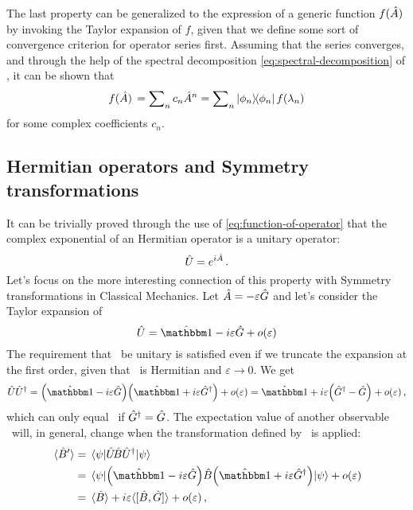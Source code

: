             The last property can be generalized to the expression of a generic function $f\pqty*{\hA}$ by invoking the Taylor expansion of $f$, given that we define some sort of convergence criterion for operator series first. Assuming that the series converges, and through the help of the spectral decomposition \eqref{eq:spectral-decomposition} of \hA, it can be shown that
            \begin{equation}
                \label{eq:function-of-operator}
                f\pqty*{\hA} = \sum\nolimits_n c_n \hA^n = \sum\nolimits_n \dyad{\phi_n}{\phi_n} f\pqty{\lambda_n}
            \end{equation}
            for some complex coefficients $c_n$.
        \subsection{Hermitian operators and Symmetry transformations}\label{ss:unitary-transformations}
            It can be trivially proved \cite{Bernardini1993-iy} through the use of \eqref{eq:function-of-operator} that the complex exponential of an Hermitian operator is a unitary operator:
            \begin{equation*}
                \hat{U} = e^{i\hat{A}}
                \,\text{.}
            \end{equation*}
            Let's focus on the more interesting connection of this property with Symmetry transformations in Classical Mechanics. Let $\hat{A} = -\varepsilon\hat{G}$ and let's consider the Taylor expansion of \hU
            \begin{equation*}
                \hU = \hidM - i\varepsilon\hG + o\pqty{\varepsilon}
            \end{equation*}
            The requirement that \hU\ be unitary is satisfied even if we truncate the expansion at the first order, given that \hG\ is Hermitian and $\varepsilon \to 0$. We get
            \begin{equation*}
                \hU\hU^\dag = \pqty{\hidM - i\varepsilon\hG}\pqty{\hidM + i\varepsilon\hG^\dag} + o\pqty{\varepsilon} = \hidM + i\varepsilon\pqty{\hG^\dag - \hG} + o\pqty{\varepsilon}
                \mycomma
            \end{equation*}
            which can only equal \hidM\ if $\hat{G}^\dag = \hat{G}$. The expectation value of another observable \hB\ will, in general, change when the transformation defined by \hU\ is applied:
            \begin{align*}
                \expval*{\hB'} &= \mel{\psi}{\hU\!\hB\hU^\dag}{\psi} \\
                &= \mel{\psi}{\pqty{\hidM - i\varepsilon\hG} \hB \pqty{\hidM + i\varepsilon\hG^\dag}}{\psi} + o\pqty{\varepsilon} \\
                &= \expval*{\hB} + i\varepsilon\!\expval*{\comm*{\hB}{\hG}\!} + o\pqty{\varepsilon}
                \mycomma
            \end{align*}
